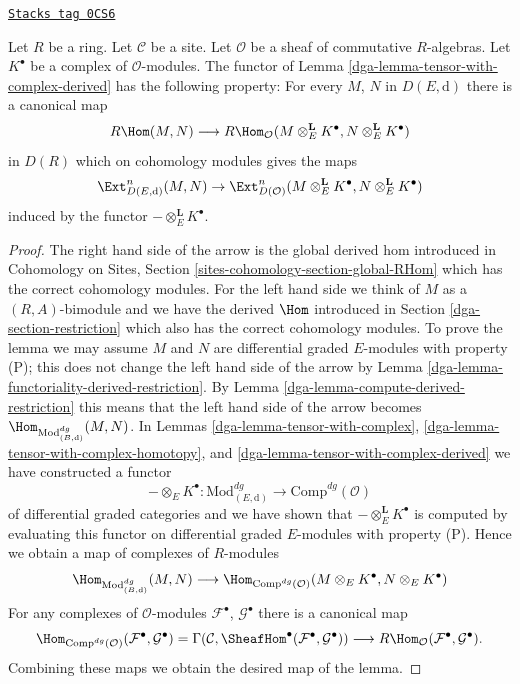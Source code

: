 \begin{lemma}
\label{dga-lemma-upgrade-tensor-with-complex-derived}
\href{https://stacks.math.columbia.edu/tag/0CS6}{\texttt{Stacks tag 0CS6}}

Let $R$ be a ring. Let $\mathcal{C}$ be a site. Let $\mathcal{O}$
be a sheaf of commutative $R$-algebras. Let $K^\bullet$
be a complex of $\mathcal{O}$-modules.
The functor
of Lemma \ref{dga-lemma-tensor-with-complex-derived} has the following
property: For every $M$, $N$ in $D(E, \text{d})$ there is a
canonical map
$$
R\Hom(M, N)
\longrightarrow
R\Hom_\mathcal{O}(M \otimes_E^\mathbf{L} K^\bullet,
N \otimes_E^\mathbf{L} K^\bullet)
$$
in $D(R)$ which on cohomology modules gives the maps
$$
\Ext^n_{D(E, \text{d})}(M, N) \to
\Ext^n_{D(\mathcal{O})}
(M \otimes_E^\mathbf{L} K^\bullet, N \otimes_E^\mathbf{L} K^\bullet)
$$
induced by the functor $- \otimes_E^\mathbf{L} K^\bullet$.
\end{lemma}

\begin{proof}

The right hand side of the arrow is the global derived hom introduced
in Cohomology on Sites, Section \ref{sites-cohomology-section-global-RHom}
which has the correct cohomology modules.
For the left hand side we think of $M$ as a $(R, A)$-bimodule and
we have the derived $\Hom$ introduced in Section \ref{dga-section-restriction}
which also has the correct cohomology modules.
To prove the lemma we may assume $M$ and $N$ are differential graded
$E$-modules with property (P); this does not change the left hand
side of the arrow by
Lemma \ref{dga-lemma-functoriality-derived-restriction}.
By Lemma \ref{dga-lemma-compute-derived-restriction}
this means that the left hand side of the arrow becomes
$\Hom_{\text{Mod}^{dg}_{(B, \text{d})}}(M, N)$.
In Lemmas \ref{dga-lemma-tensor-with-complex},
\ref{dga-lemma-tensor-with-complex-homotopy}, and
\ref{dga-lemma-tensor-with-complex-derived}
we have constructed a functor
$$
- \otimes_E K^\bullet :
\text{Mod}^{dg}_{(E, \text{d})}
\longrightarrow
\text{Comp}^{dg}(\mathcal{O})
$$
of differential graded categories
and we have shown that $- \otimes_E^\mathbf{L} K^\bullet$ is computed
by evaluating this functor
on differential graded $E$-modules with property (P).
Hence we obtain a map of complexes of $R$-modules
$$
\Hom_{\text{Mod}^{dg}_{(B, \text{d})}}(M, N)
\longrightarrow
\Hom_{\text{Comp}^{dg}(\mathcal{O})}
(M \otimes_E K^\bullet, N \otimes_E K^\bullet)
$$
For any complexes of $\mathcal{O}$-modules
$\mathcal{F}^\bullet$, $\mathcal{G}^\bullet$ there
is a canonical map
$$
\Hom_{\text{Comp}^{dg}(\mathcal{O})}
(\mathcal{F}^\bullet, \mathcal{G}^\bullet) =
\Gamma(\mathcal{C},
\SheafHom^\bullet(\mathcal{F}^\bullet, \mathcal{G}^\bullet))
\longrightarrow
R\Hom_\mathcal{O}(\mathcal{F}^\bullet, \mathcal{G}^\bullet).
$$
Combining these maps
we obtain the desired map of the lemma.
\end{proof}

